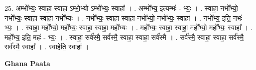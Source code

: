 \documentclass[17pt]{extarticle}
\begin{document}
25. अम्भो᳚भ्यः॒ स्वाहा॒ स्वाहा ऽम्भो॒भ्यो ऽम्भो᳚भ्यः॒ स्वाहा᳚ । . अम्भो᳚भ्य॒ इत्यम्भः॑ - भ्यः॒ । . स्वाहा॒ नभो᳚भ्यो॒ नभो᳚भ्यः॒ स्वाहा॒ स्वाहा॒ नभो᳚भ्यः । . नभो᳚भ्यः॒ स्वाहा॒ स्वाहा॒ नभो᳚भ्यो॒ नभो᳚भ्यः॒ स्वाहा᳚ । . नभो᳚भ्य॒ इति॒ नभः॑ - भ्यः॒ । . स्वाहा॒ महो᳚भ्यो॒ महो᳚भ्यः॒ स्वाहा॒ स्वाहा॒ महो᳚भ्यः । . महो᳚भ्यः॒ स्वाहा॒ स्वाहा॒ महो᳚भ्यो॒ महो᳚भ्यः॒ स्वाहा᳚ । . महो᳚भ्य॒ इति॒ महः॑ - भ्यः॒ । . स्वाहा॒ सर्व॑स्मै॒ सर्व॑स्मै॒ स्वाहा॒ स्वाहा॒ सर्व॑स्मै । . सर्व॑स्मै॒ स्वाहा॒ स्वाहा॒ सर्व॑स्मै॒ सर्व॑स्मै॒ स्वाहा᳚ । . स्वाहेति॒ स्वाहा᳚ । \newline

\textbf{Ghana Paata } \newline
\end{document}
